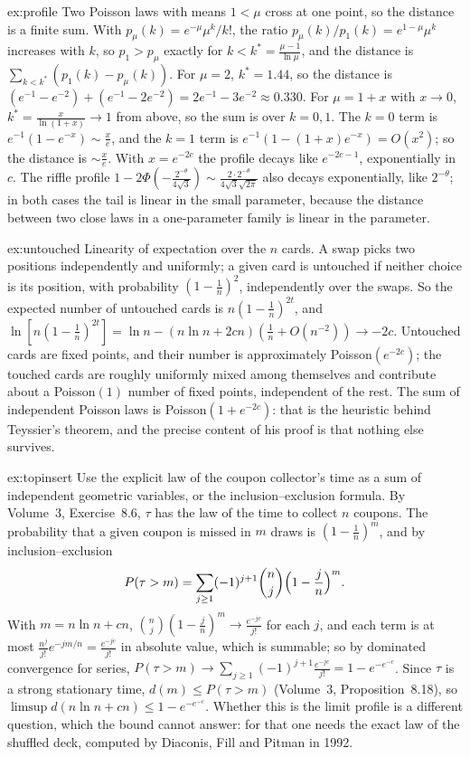 \begin{solution}{ex:profile}
\idea Two Poisson laws with means $1<\mu$ cross at one point, so the distance is a finite sum.
\writeup With $p_\mu(k)=e^{-\mu}\mu^k/k!$, the ratio $p_\mu(k)/p_1(k)=e^{1-\mu}\mu^k$ increases with $k$, so $p_1>p_\mu$ exactly for $k<k^*=\frac{\mu-1}{\ln\mu}$, and the distance is $\sum_{k<k^*}(p_1(k)-p_\mu(k))$. For
$\mu=2$, $k^*=1.44$, so the distance is $(e^{-1}-e^{-2})+(e^{-1}-2e^{-2})=2e^{-1}-3e^{-2}\approx0.330$. For $\mu=1+x$ with $x\to0$, $k^*=\frac x{\ln(1+x)}\to1$ from above, so the sum is over $k=0,1$. The $k=0$ term is $e^{-1}(1-e^{-x})\sim\frac xe$, and the $k=1$ term is
$e^{-1}(1-(1+x)e^{-x})=O(x^2)$; so the distance is $\sim\frac xe$. With
$x=e^{-2c}$ the profile decays like $e^{-2c-1}$, exponentially in $c$. The riffle profile $1-2\Phi(-\frac{2^{-\theta}}{4\sqrt3})\sim\frac{2\cdot2^{-\theta}}{4\sqrt3\sqrt{2\pi}}$ also decays exponentially, like $2^{-\theta}$; in both cases the tail is linear in the
small parameter, because the distance between two close laws in a one-parameter family is linear in the parameter.
\end{solution}

\begin{solution}{ex:untouched}
\idea Linearity of expectation over the $n$ cards.
\writeup A swap picks two positions independently and uniformly; a given card is untouched if neither choice is its position, with probability $(1-\frac1n)^2$, independently over the
swaps. So the expected number of untouched cards is $n(1-\frac1n)^{2t}$, and $\ln[n(1-\frac1n)^{2t}]=\ln n-(n\ln n+2cn)(\frac1n+O(n^{-2}))\to-2c$. Untouched cards are fixed points, and their number is
approximately Poisson$(e^{-2c})$; the touched cards are roughly uniformly mixed among themselves and contribute about a Poisson$(1)$ number of fixed points, independent of the
rest. The sum of independent Poisson laws is Poisson$(1+e^{-2c})$: that is the heuristic behind Teyssier's theorem, and the precise content of his proof is that nothing else survives.
\end{solution}

\begin{solution}{ex:topinsert}
\idea Use the explicit law of the coupon collector's time as a sum of independent geometric variables, or the inclusion--exclusion formula.
\writeup By Volume~3, Exercise~8.6, $\tau$ has the law of the time to collect $n$ coupons. The probability that a given coupon is missed in $m$ draws is $(1-\frac1n)^m$, and by inclusion--exclusion
\[
P(\tau>m)=\sum_{j\ge1}(-1)^{j+1}\binom nj\Bigl(1-\frac jn\Bigr)^m.
\]
With $m=n\ln n+cn$, $\binom nj(1-\frac jn)^m\to\frac{e^{-jc}}{j!}$ for each $j$, and each term is at most $\frac{n^j}{j!}e^{-jm/n}=\frac{e^{-jc}}{j!}$ in absolute value, which is summable; so by dominated convergence for series,
$P(\tau>m)\to\sum_{j\ge1}(-1)^{j+1}\frac{e^{-jc}}{j!}=1-e^{-e^{-c}}$. Since $\tau$ is a strong stationary time, $d(m)\le P(\tau>m)$ (Volume~3, Proposition~8.18), so $\limsup d(n\ln n+cn)\le1-e^{-e^{-c}}$. Whether this
is the limit profile is a different question, which the bound cannot answer: for that one needs the exact law of the shuffled deck, computed by Diaconis, Fill and Pitman in 1992.
\end{solution}

